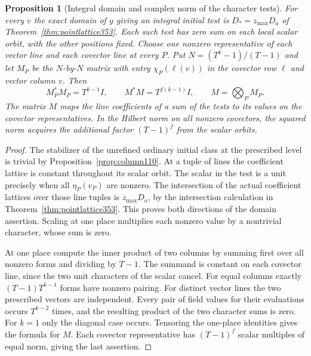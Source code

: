 \documentclass[a4paper,11pt]{article}
\newtheorem{proposition}{Proposition}[section]
\theoremstyle{definition}
\theoremstyle{remark}
\numberwithin{equation}{section}
\begin{document}
\begin{proposition}[Integral domain and complex norm of the character tests]
\label{prop:initialtest396}
For every \(v\) the exact domain of \(y\) giving an integral
initial test is \(D_*=z_{\max}D_a\) of
Theorem~\ref{thm:pointlattice353}. Each such test has zero
sum on each local scalar orbit, with the other positions fixed.
Choose one nonzero representative of each vector line and
each covector line at every \(P\). Put \(N=(T^k-1)/(T-1)\)
and let \(M_P\) be the \(N\)-by-\(N\) matrix with entry
\(\chi_P(\ell(v))\) in the covector row \(\ell\) and vector
column \(v\). Then
\[
        M_P^*M_P=T^{k-1}I,\qquad
        M^*M=T^{f(k-1)}I,\qquad M=\bigotimes_P M_P .
\]
The matrix \(M\) maps the line coefficients of a sum of the
tests to its values on the covector representatives. In the
Hilbert norm on all nonzero covectors, the squared norm acquires
the additional factor \((T-1)^f\) from the scalar orbits.
\end{proposition}
\begin{proof}
The stabilizer of the unrefined ordinary initial class at
the prescribed level is trivial by Proposition~\ref{prop:column110}.
At a tuple of lines the coefficient lattice is constant
throughout its scalar orbit. The scalar in the test is a
unit precisely when all \(\eta_P(v_P)\) are nonzero.
The intersection of the actual coefficient lattices over those
line tuples is \(z_{\max}D_a\), by the intersection calculation
in Theorem~\ref{thm:pointlattice353}. This proves both directions
of the domain assertion. Scaling at one place multiplies each
nonzero value by a nontrivial character, whose sum is zero.

At one place compute the inner product of two columns by
summing first over all nonzero forms and dividing by \(T-1\).
The summand is constant on each covector line, since the two
unit characters of the scalar cancel. For equal columns exactly
\((T-1)T^{k-1}\) forms have nonzero pairing. For distinct
vector lines the two prescribed vectors are independent.
Every pair of field values for their evaluations occurs
\(T^{k-2}\) times, and the resulting product of the two
character sums is zero. For \(k=1\) only the diagonal case
occurs. Tensoring the one-place identities gives the formula
for \(M\). Each covector representative has \((T-1)^f\)
scalar multiples of equal norm, giving the last assertion.
\end{proof}
\end{document}
